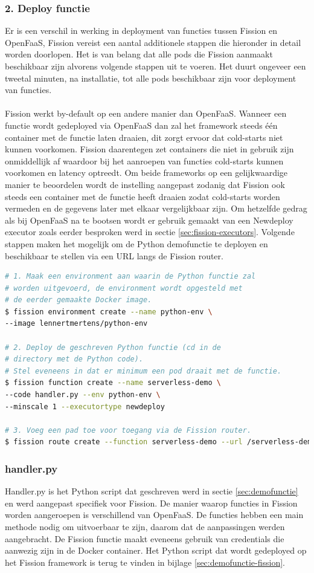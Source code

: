 \subsubsection{2. Deploy functie}
Er is een verschil in werking in deployment van functies tussen Fission en OpenFaaS, Fission vereist een aantal additionele stappen die hieronder in detail worden doorlopen. Het is van belang dat alle pods die Fission aanmaakt beschikbaar zijn alvorens volgende stappen uit te voeren. Het duurt ongeveer een tweetal minuten, na installatie, tot alle pods beschikbaar zijn voor deployment van functies.
\\\\
Fission werkt by-default op een andere manier dan OpenFaaS. Wanneer een functie wordt gedeployed via OpenFaaS dan zal het framework steeds één container met de functie laten draaien, dit zorgt ervoor dat cold-starts niet kunnen voorkomen. Fission daarentegen zet containers die niet in gebruik zijn onmiddellijk af waardoor bij het aanroepen van functies cold-starts kunnen voorkomen en latency optreedt. Om beide frameworks op een gelijkwaardige manier te beoordelen wordt de instelling aangepast zodanig dat Fission ook steeds een container met de functie heeft draaien zodat cold-starts worden vermeden en de gegevens later met elkaar vergelijkbaar zijn. Om hetzelfde gedrag als bij OpenFaaS na te bootsen wordt er gebruik gemaakt van een Newdeploy executor zoals eerder besproken werd in sectie \ref{sec:fission-executors}. Volgende stappen maken het mogelijk om de Python demofunctie te deployen en beschikbaar te stellen via een URL langs de Fission router.

\begin{lstlisting}[language=bash]
# 1. Maak een environment aan waarin de Python functie zal 
# worden uitgevoerd, de environment wordt opgesteld met 
# de eerder gemaakte Docker image.
$ fission environment create --name python-env \
--image lennertmertens/python-env

# 2. Deploy de geschreven Python functie (cd in de 
# directory met de Python code).
# Stel eveneens in dat er minimum een pod draait met de functie.
$ fission function create --name serverless-demo \
--code handler.py --env python-env \
--minscale 1 --executortype newdeploy

# 3. Voeg een pad toe voor toegang via de Fission router.
$ fission route create --function serverless-demo --url /serverless-demo
\end{lstlisting}
 
\subsubsection{handler.py}
Handler.py is het Python script dat geschreven werd in sectie \ref{sec:demofunctie} en werd aangepast specifiek voor Fission. De manier waarop functies in Fission worden aangeroepen is verschillend van OpenFaaS. De functies hebben een main methode nodig om uitvoerbaar te zijn, daarom dat de aanpassingen werden aangebracht. De Fission functie maakt eveneens gebruik van credentials die aanwezig zijn in de Docker container. Het Python script dat wordt gedeployed op het Fission framework is terug te vinden in bijlage \ref{sec:demofunctie-fission}.

